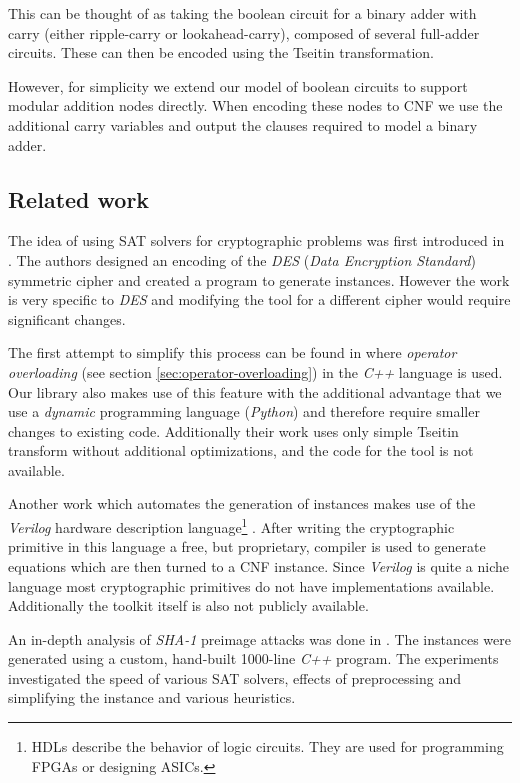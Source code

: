This can be thought of as taking the boolean circuit for a binary adder with carry (either ripple-carry or lookahead-carry), composed of several full-adder circuits.
These can then be encoded using the Tseitin transformation.

However, for simplicity we extend our model of boolean circuits to support modular addition nodes directly.
When encoding these nodes to CNF we use the additional carry variables and output the clauses required to model a binary adder.


\subsection{Related work}
\label{sec:related-work}
The idea of using SAT solvers for cryptographic problems was first introduced in \cite{massacci2000logical}.
The authors designed an encoding of the \emph{DES} (\emph{Data Encryption Standard}) symmetric cipher and created a program to generate instances.
However the work is very specific to \emph{DES} and modifying the tool for a different cipher would require significant changes.

The first attempt to simplify this process can be found in \cite{jovanovic2005logical} where \emph{operator overloading} (see section \ref{sec:operator-overloading}) in the \emph{C++} language is used.
Our library also makes use of this feature with the additional advantage that we use a \emph{dynamic} programming language (\emph{Python}) and therefore require smaller changes to existing code.
Additionally their work uses only simple Tseitin transform without additional optimizations, and the code for the tool is not available.

Another work which automates the generation of instances makes use of the \emph{Verilog} hardware description language\footnote{HDLs describe the behavior of logic circuits. They are used for programming FPGAs or designing ASICs.} \cite{morawiecki2013sat}.
After writing the cryptographic primitive in this language a free, but proprietary, compiler is used to generate equations which are then turned to a CNF instance.
Since \emph{Verilog} is quite a niche language most cryptographic primitives do not have implementations available.
Additionally the toolkit itself is also not publicly available.

An in-depth analysis of \emph{SHA-1} preimage attacks was done in \cite{nossum2012sat}.
The instances were generated using a custom, hand-built 1000-line \emph{C++} program.
The experiments investigated the speed of various SAT solvers, effects of preprocessing and simplifying the instance and various heuristics.

